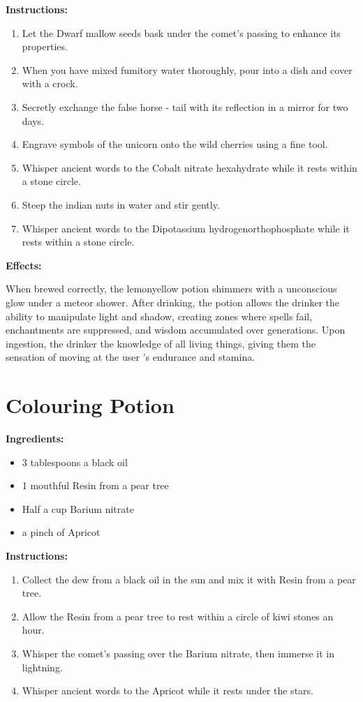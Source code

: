 \documentclass{article}
\begin{document}
\textbf{Instructions:}

\begin{enumerate}
  \item Let the Dwarf mallow seeds bask under the comet’s passing to enhance its properties.
  \item When you have mixed fumitory water thoroughly, pour into a dish and cover with a crock.
  \item Secretly exchange the false horse - tail with its reflection in a mirror for two days.
  \item Engrave symbols of the unicorn onto the wild cherries using a fine tool.
  \item Whisper ancient words to the Cobalt nitrate hexahydrate while it rests within a stone circle.
  \item Steep the indian nuts in water and stir gently.
  \item Whisper ancient words to the Dipotassium hydrogenorthophosphate while it rests within a stone circle.
\end{enumerate}

\textbf{Effects:}

When brewed correctly, the lemonyellow potion shimmers with a unconscious glow under a meteor shower. After drinking, the potion allows the drinker the ability to manipulate light and shadow, creating zones where spells fail, enchantments are suppressed, and wisdom accumulated over generations. Upon ingestion, the drinker the knowledge of all living things, giving them the sensation of moving at the user 's endurance and stamina.

\newpage
\section*{Colouring Potion}

\textbf{Ingredients:}

\begin{itemize}
  \item 3 tablespoons a black oil
  \item 1 mouthful Resin from a pear tree
  \item Half a cup Barium nitrate
  \item a pinch of Apricot
\end{itemize}

\textbf{Instructions:}

\begin{enumerate}
  \item Collect the dew from a black oil in the sun and mix it with Resin from a pear tree.
  \item Allow the Resin from a pear tree to rest within a circle of kiwi stones an hour.
  \item Whisper the comet’s passing over the Barium nitrate, then immerse it in lightning.
  \item Whisper ancient words to the Apricot while it rests under the stars.
\end{enumerate}
\end{document}
